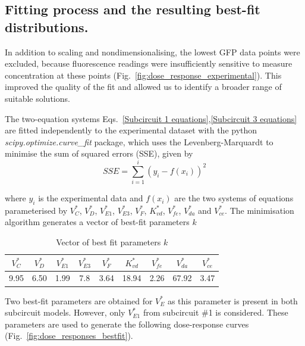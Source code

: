 \subsection{Fitting process and the resulting best-fit distributions.} \label{Fitting process and the resulting best fit distributions.}
In addition to scaling and nondimensionalising, the lowest GFP data points were excluded,
because fluorescence readings were insufficiently sensitive
to measure concentration at these points (Fig.~\ref{fig:dose_response_experimental}).
This improved the quality of the fit and allowed us to identify a broader range of suitable solutions.

The two-equation systems Eqs.~\ref{Subcircuit 1 equations},\ref{Subcircuit 3 equations}
are fitted independently to the experimental dataset with the python \textit{scipy.optimize.curve\_fit} package,
which uses the Levenberg-Marquardt to minimise the sum of squared errors (SSE), given by
\begin{equation}
    SSE = \sum_{i=1}^{i} (y_{i}-f(x_{i}))^2
\end{equation}

where $y_i$ is the experimental data
and $f(x_i)$ are the two systems of equations
parameterised by $V^*_{C}$, $V^*_{D}$, $V^*_{E1}$, $V^*_{E3}$, $V^*_{F}$, $K^*_{vd}$, $V^*_{fe}$, $V^*_{da}$
and $V^*_{ce}$.
The minimisation algorithm generates a vector of best-fit parameters $k$

\begin{table}[H]
    \centering
    \begin{tabular}{|c|c|c|c|c|c|c|c|c|}
        \hline
        \textbf{$V^*_{C}$} & \textbf{$V^*_{D}$} & \textbf{$V^*_{E1}$} & \textbf{$V^*_{E3}$} & \textbf{$V^*_{F}$} & \textbf{$K^*_{vd}$} & \textbf{$V^*_{fe}$} & \textbf{$V^*_{da}$} & \textbf{$V^*_{ce}$} \\
        \hline
        9.95 & 6.50 & 1.99 & 7.8 & 3.64 & 18.94 & 2.26 & 67.92 & 3.47 \\
        \hline
    \end{tabular}
    \caption{Vector of best fit parameters $k$}
    \label{table:bestfit table}
\end{table}


Two best-fit parameters are obtained for $V^*_{E}$ as this parameter is present in both subcircuit models.
However, only $V^*_{E1}$ from subcircuit \#1 is considered.
These parameters are used to generate the following dose-response curves (Fig.~\ref{fig:dose_responses_bestfit}).


